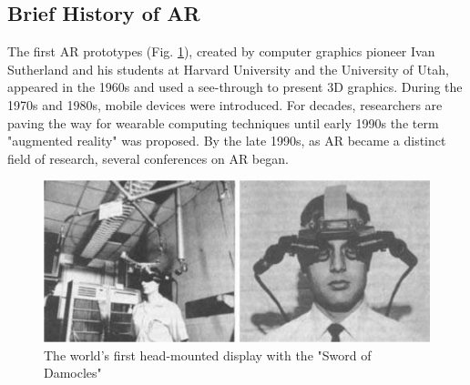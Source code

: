 \documentclass[preprint,12pt]{elsarticle}
\begin{document}
\subsection{Brief History of AR}
The first AR prototypes (Fig. \ref{the first head-mounted-device}), created by computer graphics pioneer Ivan Sutherland and his students at Harvard University and the University of Utah, appeared in the 1960s and used a see-through to present 3D graphics\cite{tamura2001mixed}. During the 1970s and 1980s, mobile devices were introduced. For decades, researchers are paving the way for wearable computing techniques until early 1990s the term "augmented reality" was proposed\cite{caudell1992augmented}. By the late 1990s, as AR became a distinct field of research, several conferences on AR began.


\begin{figure}[!hbp]
	\centering
	\includegraphics[width=12cm]{./figs/device-first-hmd.png}
	\caption{The world's first head-mounted display with the "Sword of Damocles"\cite{tamura2001mixed}}
	\label{the first head-mounted-device}
\end{figure}
\end{document}
